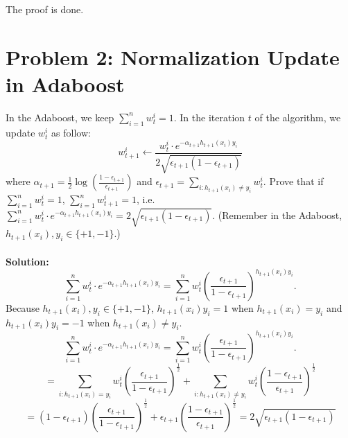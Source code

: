 \documentclass{article}
\begin{document}
	The proof is done.
	
	
	
	\section*{Problem 2: Normalization Update in Adaboost}
	In the Adaboost, we keep $\sum_{i=1}^n w^i_t = 1$. In the iteration $t$ of the algorithm, we update $w_t^i$ as follow: 
	$$w^i _{t+1}\leftarrow \frac{w^i_t\cdot e^{-\alpha_{t+1} h_{t+1}(x_i)y_i}}{2\sqrt{\epsilon_{t+1}(1-\epsilon_{t+1})}}$$
	where $\alpha_{t+1} = \frac{1}{2}\log \left(\frac{1 - \epsilon_{t+1}}{\epsilon_{t+1}}\right)$ and  $\epsilon_{t+1} = \sum_{i:h_{t+1}(x_i)\neq y_i}w^i_t$. Prove that if $\sum_{i=1}^n w^i_t = 1$, $\sum_{i=1}^n w^i_{t+1} = 1$, i.e. $\sum_{i=1}^{n} w^i_t \cdot e^{-\alpha_{t+1} h_{t+1}(x_i)y_i} = 2\sqrt{\epsilon_{t+1} (1-\epsilon_{t+1})}$. (Remember in the Adaboost, $h_{t+1}(x_i),y_i\in \{+1, -1\}$.) \\
	\\
	\textbf{Solution:}
	$$
	\sum_{i=1}^{n} w^i_t \cdot e^{-\alpha_{t+1} h_{t+1}(x_i)y_i} = \sum_{i=1}^{n} w^i_t \left(\frac{\epsilon_{t+1}}{1 - \epsilon_{t+1}}\right)^{h_{t+1}(x_i)y_i}.
	$$
	Because $h_{t+1}(x_i),y_i\in\{+1, -1\}$, $h_{t+1}(x_i)y_i = 1$ when $h_{t+1}(x_i) = y_i$ and $h_{t+1}(x_i)y_i = -1$ when $h_{t+1}(x_i) \neq y_i$.
	$$
	\sum_{i=1}^{n} w^i_t \cdot e^{-\alpha_{t+1} h_{t+1}(x_i)y_i} = \sum_{i=1}^{n} w^i_t \left(\frac{\epsilon_{t+1}}{1 - \epsilon_{t+1}}\right)^{h_{t+1}(x_i)y_i}.
	$$
	$$
	=\sum_{i:h_{t+1}(x_i) = y_i}w^i_t \left(\frac{\epsilon_{t+1}}{1 - \epsilon_{t+1}}\right)^{\frac{1}{2}} + \sum_{i:h_{t+1}(x_i) \neq y_i}w^i_t \left(\frac{1 - \epsilon_{t+1}}{\epsilon_{t+1}}\right)^{\frac{1}{2}}
	$$
	$$
	=\left(1 - \epsilon_{t+1}\right) \left(\frac{\epsilon_{t+1}}{1 - \epsilon_{t+1}}\right)^{\frac{1}{2}} + \epsilon_{t+1} \left(\frac{1 - \epsilon_{t+1}}{\epsilon_{t+1}}\right)^{\frac{1}{2}} = 2\sqrt{\epsilon_{t+1} (1-\epsilon_{t+1})}
	$$
\end{document}
